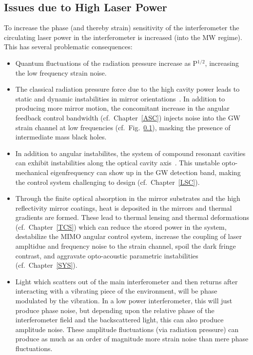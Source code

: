 \subsection{Issues due to High Laser Power}
To increase the phase (and thereby strain) sensitivity of the interferometer
the circulating laser power in the interferometer is increased (into the MW
regime). This has several problematic consequences:
\begin{itemize}
\item Quantum fluctuations of the radiation pressure increase as P$^{1/2}$, increasing the low frequency strain noise.
\item The classical radiation pressure force due to the high cavity power
leads to static and dynamic instabilities in mirror
orientations~\cite{Sidles:2006un, Dooley:13, aLIGO:ASC}. In addition to producing
more mirror motion, the concomitant increase in the angular feedback
control bandwidth (cf.~Chapter~\ref{ASC}) injects noise into the GW strain
channel at low frequencies (cf.~Fig.~\ref{}), masking the presence of intermediate mass black holes.
\item In addition to angular instabilites, the system of compound resonant cavities can exhibit instabilities along the optical cavity axis~\cite{SGLMW2004, BuCh2002, Osamu:spring}. This
unstable opto-mechanical eigenfrequency can show up in the GW detection band,
making the control system challenging to design (cf.~Chapter~\ref{LSC}).
\item Through the finite optical absorption in the mirror substrates and the
high reflectivity mirror coatings, heat is deposited in the mirrors and thermal
gradients are formed. These lead to thermal lensing and thermal deformations
(cf.~Chapter~\ref{TCS}) which can reduce the stored power in the system, destabilize
the MIMO angular control system, increase the coupling of laser ampltidue and
frequency noise to the strain channel, spoil the dark fringe contrast, and
aggravate opto-acoustic parametric instabilities (cf.~Chapter~\ref{SYS}).
\item Light which scatters out of the main interferometer and then returns after interacting with a vibrating piece of the environment, will be phase modulated by the vibration. In a low power interferometer, this will just produce phase noise, but depending upon the relative phase of the interferometer field and the backscattered light, this can also produce amplitude noise. These amplitude fluctuations (via radiation pressure) can produce as much as an order of magnitude more strain noise than mere phase fluctuations.

\end{itemize}

